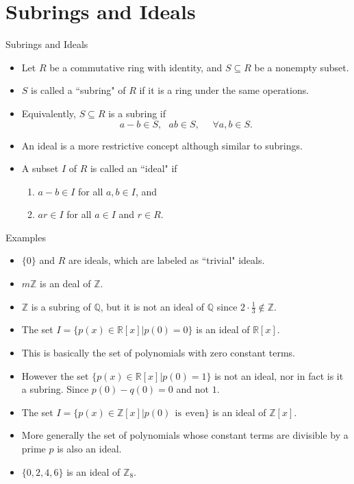 \documentclass[ %
 10pt, xcolor={dvipsnames,svgnames,x11names,hyperref},
   hyperref={colorlinks=true,citecolor=green,linkcolor=DarkRed,urlcolor=ProcessBlue,anchorcolor=blue}
  ]{beamer}
\newenvironment{stepitemize}{\begin{itemize}[<+->]}{\end{itemize} }
\newcommand{\Z}{\mathbb{Z}}
\newcommand{\Q}{\mathbb{Q}}
\newcommand{\R}{\mathbb{R}}
\begin{document}
\section{Subrings and Ideals}
\begin{frame}{Subrings and Ideals}
\begin{stepitemize}
\item Let $R$ be a commutative ring with identity, and $S\subseteq R$ be a nonempty subset. 
\item $S$ is called a ``subring" of $R$ if it is a ring under the same operations. 
\item Equivalently, $S\subseteq R$ is a subring if 
$$a-b\in S, \:\:\: ab\in S, \:\:\:\:\:\:\forall a,b\in S.$$
\item An ideal is a more restrictive concept although similar to subrings. 
\item A subset $I$ of $R$ is called an ``ideal" if
\begin{enumerate}
    \item $a-b\in I$ for all $a,b \in I$, and
    \item $ar \in I$ for all $a \in I$ and $r \in R$.
\end{enumerate}
\end{stepitemize}
\end{frame}

\begin{frame}{Examples}
    \begin{stepitemize}
    \item $\{0\}$ and $R$ are ideals, which are labeled as ``trivial" ideals. 
    \item $m\Z$ is an deal of $\Z$.
    \item $\Z$ is a subring of $\Q$, but it is not an ideal of $\Q$ since $2\cdot \frac{1}{3} \not \in \Z$. 
    \item The set $I = \{p(x) \in \R[x]|p(0)=0\}$ is an ideal of $\R[x]$. 
    \item This is basically the set of polynomials with zero constant terms. 
    \item However the set $\{p(x)\in \R[x]|p(0)=1\}$ is not an ideal, nor in fact is it a subring. Since $p(0)-q(0)=0$ and not $1$.
    \item The set $I = \{p(x) \in \Z[x] | p(0) \:\:\textrm{is} \:\:\textrm{even}\}$ is an ideal of $\Z[x]$. 
    \item More generally the set of polynomials whose constant terms are divisible by a prime $p$ is also an ideal. 
    \item $\{0,2,4,6\}$ is an ideal of $\Z_8$. 
    \end{stepitemize}
\end{frame}
\end{document}
